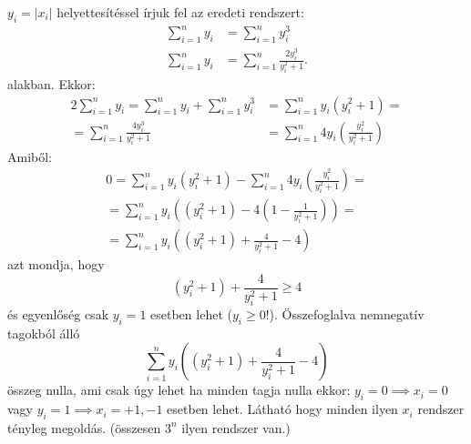    $y_{i}=|x_{i}|$ helyettesítéssel írjuk fel az eredeti rendszert:
   \begin{align*}
   \sum_{i=1}^{n} y_{i} &= \sum_{i=1}^{n} y_{i}^{3} \\
   \sum_{i=1}^{n} y_{i} &= \sum_{i=1}^{n} \frac{2y_{i}^{3}}{y_{i}^{2}+1}.
   \end{align*}
   alakban. Ekkor: 
   \begin{align*}
   2\sum_{i=1}^{n} y_{i} = \sum_{i=1}^{n} y_{i} + \sum_{i=1}^{n} y_{i}^{3} &=
   \sum_{i=1}^{n} y_{i}(y_{i}^{2}+1)= \\
   =\sum_{i=1}^{n} \frac{4y_{i}^{3}}{y_{i}^{2}+1} &=
   \sum_{i=1}^{n} 4y_{i}{\left( \frac{y_{i}^{2}}{y_{i}^{2}+1} \right) }
   \end{align*}
   Amiből:
   \begin{align*}
   0=\sum_{i=1}^{n} y_{i}(y_{i}^{2}+1)-
   \sum_{i=1}^{n} 4y_{i}{\left( \frac{y_{i}^{2}}{y_{i}^{2}+1} \right)}= \\
   =\sum_{i=1}^{n} y_{i}\left( (y_{i}^{2}+1)-4{\left( 1-\frac{1}{y_{i}^{2}+1} \right)} \right) = \\
   =\sum_{i=1}^{n} y_{i}\left( (y_{i}^{2}+1)+\frac{4}{y_{i}^{2}+1} - 4 \right)
   \end{align*}
    azt mondja, hogy 
   \begin{equation*}
   (y_{i}^{2}+1)+\frac{4}{y_{i}^{2}+1} \ge 4 
   \end{equation*}
   és egyenlőség csak $y_{i}=1$ esetben lehet ($y_{i}\ge 0$!). Összefoglalva nemnegatív tagokból álló
   \begin{equation*}
   \sum_{i=1}^{n} y_{i}\left( (y_{i}^{2}+1)+\frac{4}{y_{i}^{2}+1} - 4 \right)
   \end{equation*}
   összeg nulla, ami csak úgy lehet ha minden tagja nulla ekkor: 
   $y_{i}=0 \implies x_{i}=0$ vagy $y_{i}=1 \implies x_{i}=+1,-1$ esetben lehet. Látható hogy 
   minden ilyen $x_{i}$ rendszer tényleg megoldás. (összesen $3^n$ ilyen rendszer van.)

